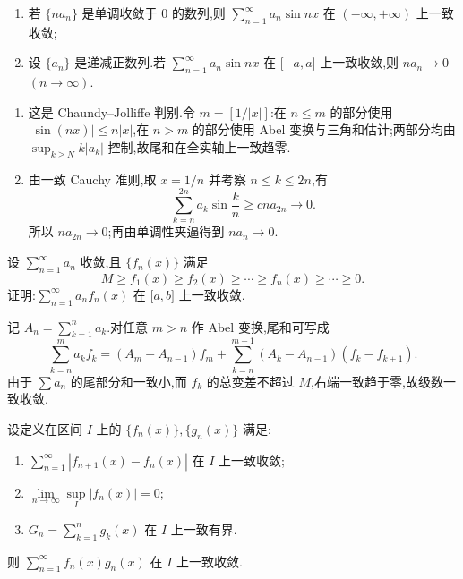 \begin{example}
    \begin{enumerate}
        \item 若 $\{na_n\}$ 是单调收敛于 $0$ 的数列,则 $\displaystyle\sum\limits_{n=1}^{\infty}a_n\sin nx$ 在 $(-\infty,+\infty)$ 上一致收敛;
        \item 设 $\{a_n\}$ 是递减正数列.若 $\displaystyle\sum\limits_{n=1}^{\infty}a_n\sin nx$ 在 $\lbrack -a,a\rbrack$ 上一致收敛,则 $na_n\to0$ $(n\to\infty)$.
    \end{enumerate}
\end{example}
\exampleblank

\begin{solution}
    \begin{enumerate}
        \item 这是 Chaundy--Jolliffe 判别.令 $m=[1/|x|]$:在 $n\leq m$ 的部分使用 $|\sin(nx)|\leq n|x|$,在 $n>m$ 的部分使用 Abel 变换与三角和估计;两部分均由 $\sup_{k\geq N}k|a_k|$ 控制,故尾和在全实轴上一致趋零.
        \item 由一致 Cauchy 准则,取 $x=1/n$ 并考察 $n\leq k\leq2n$,有
              \[
                  \sum\limits_{k=n}^{2n}a_k\sin\dfrac{k}{n}\geq cna_{2n}\longrightarrow0.
              \]
              所以 $na_{2n}\to0$;再由单调性夹逼得到 $na_n\to0$.
    \end{enumerate}
\end{solution}

\begin{example}
    设 $\displaystyle\sum\limits_{n=1}^{\infty}a_n$ 收敛,且 $\{f_n(x)\}$ 满足
    \[
        M\geq f_1(x)\geq f_2(x)\geq\cdots\geq f_n(x)\geq\cdots\geq0.
    \]
    证明:$\displaystyle\sum\limits_{n=1}^{\infty}a_nf_n(x)$ 在 $\lbrack a,b\rbrack$ 上一致收敛.
\end{example}
\exampleblank

\begin{solution}
    记 $A_n=\sum_{k=1}^{n}a_k$.对任意 $m>n$ 作 Abel 变换,尾和可写成
    \[
        \sum\limits_{k=n}^{m}a_kf_k
        =(A_m-A_{n-1})f_m+
        \sum\limits_{k=n}^{m-1}(A_k-A_{n-1})(f_k-f_{k+1}).
    \]
    由于 $\sum a_n$ 的尾部分和一致小,而 $f_k$ 的总变差不超过 $M$,右端一致趋于零,故级数一致收敛.
\end{solution}

\begin{example}
    设定义在区间 $I$ 上的 $\{f_n(x)\},\{g_n(x)\}$ 满足:
    \begin{enumerate}
        \item $\displaystyle\sum\limits_{n=1}^{\infty}|f_{n+1}(x)-f_n(x)|$ 在 $I$ 上一致收敛;
        \item $\displaystyle\lim\limits_{n\to\infty}\sup\limits_I|f_n(x)|=0$;
        \item $G_n=\displaystyle\sum\limits_{k=1}^n g_k(x)$ 在 $I$ 上一致有界.
    \end{enumerate}
    则 $\displaystyle\sum\limits_{n=1}^{\infty}f_n(x)g_n(x)$ 在 $I$ 上一致收敛.
\end{example}
\exampleblank

